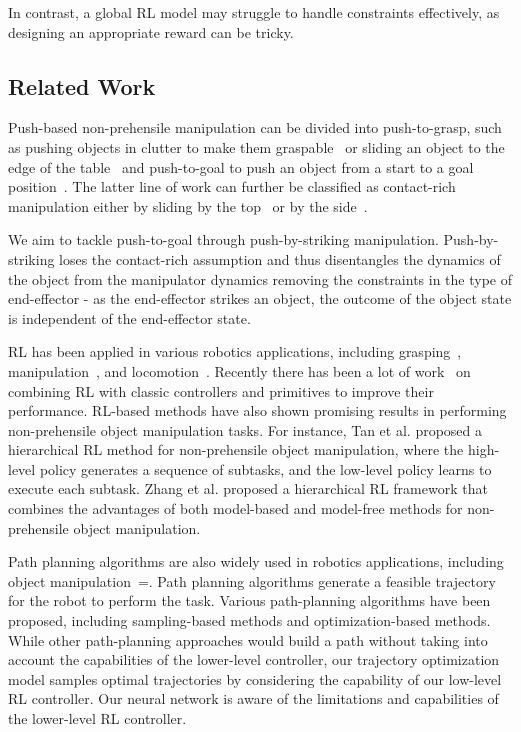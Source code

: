In contrast, a global RL model may struggle to handle constraints effectively, as designing an appropriate reward can be tricky. 

\subsection{Related Work}

Push-based non-prehensile manipulation can be divided into push-to-grasp, such as pushing objects in clutter to make them graspable~\cite{huang2021dipn, huang2021visual} or sliding an object to the edge of the table~\cite{pregraspsliding, King-2013-7735} and push-to-goal to push an object from a start to a goal position~\cite{iros2022, icra2018, moura2022non, bai2021hierarchical-more}. The latter line of work can further be classified as contact-rich manipulation either by sliding by the top~\cite{xu2021cocoi, song2019object, icra2018, iros2022} or by the side~\cite{moura2022non}. 

We aim to tackle push-to-goal through push-by-striking manipulation. Push-by-striking loses the contact-rich assumption and thus disentangles the dynamics of the object from the manipulator dynamics removing the constraints in the type of end-effector - as the end-effector strikes an object, the outcome of the object state is independent of the end-effector state. 

RL has been applied in various robotics applications, including grasping~\cite{grasp1, grasp2,grasp3}, manipulation~\cite{manipulation1, manipulation2}, and locomotion~\cite{locomotion1, locomotion2}. Recently there has been a lot of work~\cite{residual1, residual2, residual3} on combining RL with classic controllers and primitives to improve their performance. RL-based methods have also shown promising results in performing non-prehensile object manipulation tasks. For instance, Tan et al.\cite{hierarchical-rl} proposed a hierarchical RL method for non-prehensile object manipulation, where the high-level policy generates a sequence of subtasks, and the low-level policy learns to execute each subtask. Zhang et al.\cite{zhang-rl} proposed a hierarchical RL framework that combines the advantages of both model-based and model-free methods for non-prehensile object manipulation.

Path planning algorithms are also widely used in robotics applications, including object manipulation~=\cite{planning1, planning2, planning3}. Path planning algorithms generate a feasible trajectory for the robot to perform the task. Various path-planning algorithms have been proposed, including sampling-based methods\cite{planning1} and optimization-based methods\cite{planning2}. While other path-planning approaches would build a path without taking into account the capabilities of the lower-level controller, our trajectory optimization model samples optimal trajectories by considering the capability of our low-level RL controller. Our neural network is aware of the limitations and capabilities of the lower-level RL controller. 

